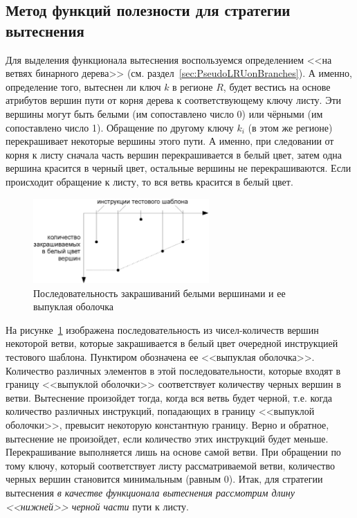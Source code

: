 \subsection{Метод функций полезности для стратегии вытеснения \PseudoLRU}

Для выделения функционала вытеснения воспользуемся определением \PseudoLRU <<на
ветвях бинарного дерева>> (см. раздел~\ref{sec:PseudoLRUonBranches}). А именно,
определение того, вытеснен ли ключ $k$ в регионе $R$, будет вестись на основе
атрибутов вершин пути от корня дерева к соответствующему ключу листу. Эти
вершины могут быть белыми (им сопоставлено число 0) или чёрными (им сопоставлено
число 1). Обращение по другому ключу $k_i$ (в этом же регионе) перекрашивает
некоторые вершины этого пути. А именно, при следовании от корня к листу сначала
часть вершин перекрашивается в белый цвет, затем одна вершина красится в черный
цвет, остальные вершины не перекрашиваются. Если происходит обращение к листу,
то вся ветвь красится в белый цвет.

\begin{figure}[h] \center
  \includegraphics[width=0.6\textwidth]{2.theor/white_feeds}
  \caption{Последовательность закрашиваний белыми вершинами и ее выпуклая
оболочка}\label{fig:white-feeds}
\end{figure}

На рисунке~\ref{fig:white-feeds} изображена последовательность из
чисел-количеств вершин некоторой ветви, которые закрашивается в белый цвет
очередной инструкцией тестового шаблона. Пунктиром обозначена ее <<выпуклая
оболочка>>. Количество различных элементов в этой последовательности, которые
входят в границу <<выпуклой оболочки>> соответствует количеству черных вершин в
ветви. Вытеснение произойдет тогда, когда вся ветвь будет черной, т.е. когда
количество различных инструкций, попадающих в границу <<выпуклой оболочки>>,
превысит некоторую константную границу. Верно и обратное, вытеснение не
произойдет, если количество этих инструкций будет меньше. Перекрашивание
выполняется лишь на основе самой ветви. При обращении по тому ключу, который
соответствует листу рассматриваемой ветви, количество черных вершин становится
минимальным (равным 0). Итак, для стратегии вытеснения \PseudoLRU \emph{в
качестве функционала вытеснения рассмотрим длину <<нижней>> черной части} пути к
листу.


